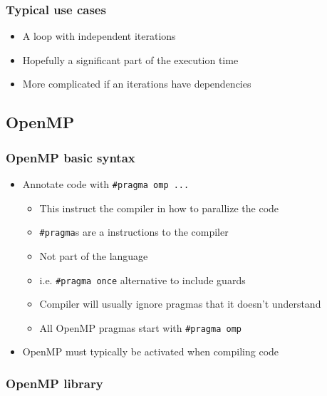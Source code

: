 \subsubsection{Typical use cases}\label{typical-use-cases}

\begin{itemize}
\itemsep1pt\parskip0pt
\item
  A loop with independent iterations
\item
  Hopefully a significant part of the execution time
\item
  More complicated if an iterations have dependencies
\end{itemize}

\subsection{OpenMP}\label{openmp-1}

\subsubsection{OpenMP basic syntax}\label{openmp-basic-syntax}

\begin{itemize}
\itemsep1pt\parskip0pt
\item
  Annotate code with \texttt{\#pragma omp ...}

  \begin{itemize}
  \itemsep1pt\parskip0pt
  \item
    This instruct the compiler in how to parallize the code
  \item
    \texttt{\#pragma}s are a instructions to the compiler
  \item
    Not part of the language
  \item
    i.e. \texttt{\#pragma once} alternative to include guards
  \item
    Compiler will usually ignore pragmas that it doesn't understand
  \item
    All OpenMP pragmas start with \texttt{\#pragma omp}
  \end{itemize}
\item
  OpenMP must typically be activated when compiling code
\end{itemize}

\subsubsection{OpenMP library}\label{openmp-library}

